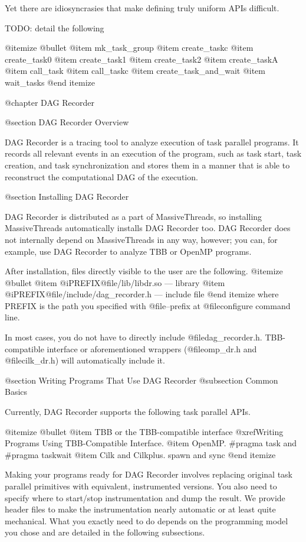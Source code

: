 Yet there are idiosyncrasies that make defining truly uniform APIs
difficult.  

TODO: detail the following

@itemize @bullet
@item mk_task_group
@item create_taskc
@item create_task0
@item create_task1
@item create_task2
@item create_taskA
@item call_task
@item call_taskc
@item create_task_and_wait
@item wait_tasks
@end itemize

@chapter DAG Recorder

@section DAG Recorder Overview 

DAG Recorder is a tracing tool to analyze execution of task parallel
programs.  It records all relevant events in an execution of the
program, such as task start, task creation, and task synchronization and
stores them in a manner that is able to reconstruct the computational
DAG of the execution.

@section Installing DAG Recorder

DAG Recorder is distributed as a part of MassiveThreads, so installing
MassiveThreads automatically installs DAG Recorder too.  DAG Recorder
does not internally depend on MassiveThreads in any way, however; you
can, for example, use DAG Recorder to analyze TBB or OpenMP programs.  

After installation, files directly visible to the user are the following.
@itemize @bullet
@item @i{PREFIX}@file{/lib/libdr.so} --- library
@item @i{PREFIX}@file{/include/dag_recorder.h} --- include file
@end itemize
where PREFIX is the path you specified with @file{--prefix} at
@file{configure} command line.  

In most cases, you do not have to directly include
@file{dag_recorder.h}.  TBB-compatible interface or aforementioned
wrappers (@file{omp_dr.h} and @file{cilk_dr.h}) will automatically
include it.

@section Writing Programs That Use DAG Recorder
@subsection Common Basics

Currently, DAG Recorder supports the following task parallel APIs.

@itemize @bullet
@item TBB or the TBB-compatible interface @xref{Writing Programs Using TBB-Compatible Interface}.
@item OpenMP. #pragma task and #pragma taskwait
@item Cilk and Cilkplus. spawn and sync
@end itemize

Making your programs ready for DAG Recorder involves replacing original
task parallel primitives with equivalent, instrumented versions.  You
also need to specify where to start/stop instrumentation and dump the
result.  We provide header files to make the instrumentation nearly
automatic or at least quite mechanical.  What you exactly need to do
depends on the programming model you chose and are detailed in the
following subsections.

